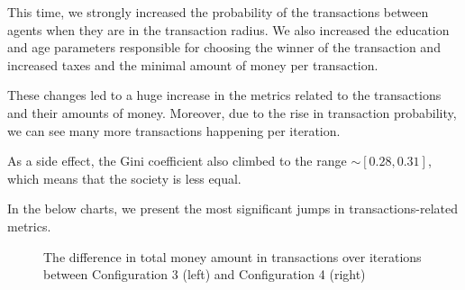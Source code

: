 \documentclass[english]{projectreport}
\begin{document}
    This time, we strongly increased the probability of the transactions between agents when they are in the transaction radius. We also increased the education and age parameters responsible for choosing the winner of the transaction and increased taxes and the minimal amount of money per transaction.

    These changes led to a huge increase in the metrics related to the transactions and their amounts of money. Moreover, due to the rise in transaction probability, we can see many more transactions happening per iteration.

    As a side effect, the Gini coefficient also climbed to the range $\sim [0.28, 0.31]$, which means that the society is less equal.

    In the below charts, we present the most significant jumps in transactions-related metrics.

\begin{figure}[H]
\begin{center}
%
\end{center}
\caption{The difference in total money amount in transactions over iterations between Configuration 3 (left) and Configuration 4 (right)}
\end{figure}
\end{document}
